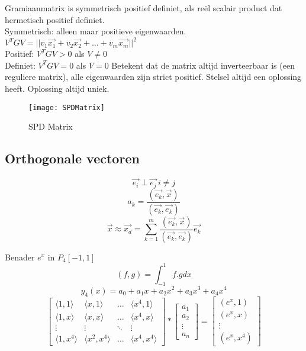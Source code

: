 Gramiaanmatrix is symmetrisch positief definiet, als re\"el scalair product dat hermetisch positief definiet. \\
Symmetrisch: alleen maar positieve eigenwaarden.
$V^TGV=|| v_1 \vec{x_1} + v_2\vec{x_2} + \ldots +v_m \vec{x_m}||^2$ \\
Positief: $V^TGV > 0$ als $V\neq 0$ \\
Definiet: $V^TGV=0$ als $V=0$ Betekent dat de matrix altijd inverteerbaar is (een reguliere matrix), alle eigenwaarden zijn strict positief. Stelsel altijd een oplossing heeft. Oplossing altijd uniek.
\begin{figure}[h]
	\centering
	\texttt{[image: SPDMatrix]}
	\caption{SPD Matrix}
\end{figure}

\subsection{Orthogonale vectoren}
\begin{equation*}
\vec{e_i} \perp \vec{e_j} \, i\neq j
\end{equation*}
\begin{equation*}
a_k = \frac{(\vec{e_k},\vec{x})}{(\vec{e_k},\vec{e_k})} 
\end{equation*}
\begin{equation*}
\vec{x} \approx \vec{x_d} = \sum_{k=1}^m \frac{(\vec{e_k},\vec{x})}{(\vec{e_k},\vec{e_k})}\vec{e_k}
\end{equation*}

Benader $e^x$ in $P_4[-1,1]$
\begin{equation*}
(f,g)=\int_{-1}^1 f.g dx
\end{equation*}
\begin{equation*}
y_4(x)=a_0+a_1x+a_2x^2+a_3x^3+a_4x^4
\end{equation*}
\begin{equation*}
{\begin{bmatrix}\langle 1,1\rangle &\langle x,1 \rangle &\dots &\langle x^4,1\rangle \\\langle 1,x\rangle &\langle x,x \rangle &\dots &\langle x^4,x\rangle \\\vdots &\vdots &\ddots &\vdots \\\langle 1,x^4\rangle &\langle x^2,x^4\rangle &\dots &\langle x^4,x^4 \rangle \end{bmatrix}} * \begin{bmatrix} a_1 \\ a_2 \\ \vdots \\ a_n \end{bmatrix} = \begin{bmatrix} (e^x,1) \\ (e^x,x) \\ \vdots \\ (e^x,x^4)    \end{bmatrix}  
\end{equation*}

